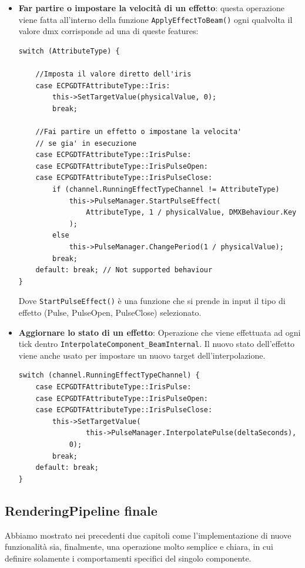 \documentclass[main.tex]{subfiles}
\begin{document}
\begin{itemize}
    \item \textbf{Far partire o impostare la velocità di un effetto}: questa operazione viene fatta all'interno della funzione \lstinline{ApplyEffectToBeam()} ogni qualvolta il valore dmx corrisponde ad una di queste features:
    \begin{lstlisting}
switch (AttributeType) {

    //Imposta il valore diretto dell'iris
	case ECPGDTFAttributeType::Iris:
		this->SetTargetValue(physicalValue, 0);
		break;

    //Fai partire un effetto o impostane la velocita'
    // se gia' in esecuzione
	case ECPGDTFAttributeType::IrisPulse:
	case ECPGDTFAttributeType::IrisPulseOpen:
	case ECPGDTFAttributeType::IrisPulseClose:
		if (channel.RunningEffectTypeChannel != AttributeType) 
            this->PulseManager.StartPulseEffect(
                AttributeType, 1 / physicalValue, DMXBehaviour.Key
            );
		else
            this->PulseManager.ChangePeriod(1 / physicalValue);
		break;
    default: break; // Not supported behaviour
}
\end{lstlisting}
    Dove \lstinline{StartPulseEffect()} è una funzione che si prende in input il tipo di effetto (Pulse, PulseOpen, PulseClose) selezionato.
    \item \textbf{Aggiornare lo stato di un effetto}: Operazione che viene effettuata ad ogni tick dentro \lstinline{InterpolateComponent_BeamInternal}. Il nuovo stato dell'effetto viene anche usato per impostare un nuovo target dell'interpolazione.
    \begin{lstlisting}
switch (channel.RunningEffectTypeChannel) {
    case ECPGDTFAttributeType::IrisPulse:
    case ECPGDTFAttributeType::IrisPulseOpen:
    case ECPGDTFAttributeType::IrisPulseClose:
        this->SetTargetValue(
                this->PulseManager.InterpolatePulse(deltaSeconds),
            0);
        break;
    default: break;
}
\end{lstlisting}
\end{itemize}

\subsection{RenderingPipeline finale}\label{subsec:5_final}
Abbiamo mostrato nei precedenti due capitoli come l'implementazione di nuove funzionalità sia, finalmente, una operazione molto semplice e chiara, in cui definire solamente i comportamenti specifici del singolo componente.
\end{document}
